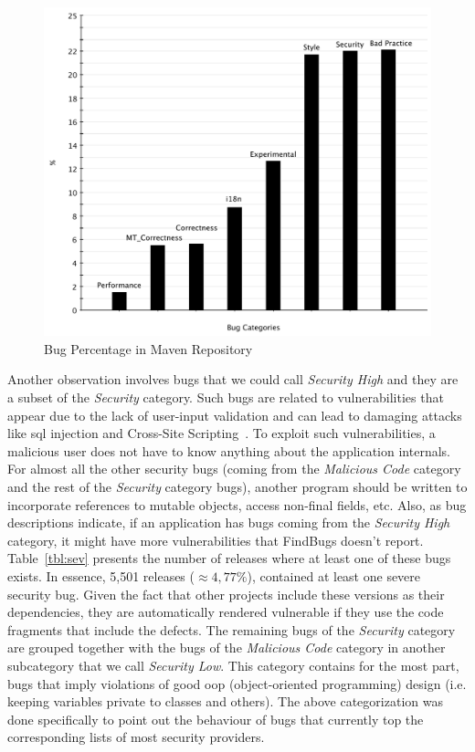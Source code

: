 \documentclass[letterpaper,twocolumn,10pt]{article}
\begin{document}
\begin{figure}[t]
	\centering
	\includegraphics[scale=0.35]{bug_percent}
	\caption{Bug Percentage in Maven Repository}
	\label{fig:bug-per} 
\end{figure}

Another observation involves bugs that we could call {\it
Security High} and they are a subset of the {\it Security} category.
Such bugs are related to vulnerabilities that appear due to the lack of user-input
validation and can lead to damaging attacks like {\sc sql} injection and
Cross-Site Scripting~\cite{RL12}.
To exploit such vulnerabilities, a malicious user does
not have to know anything about the application internals.
For almost all the other security bugs (coming from
the {\it Malicious Code} category and the rest of
the {\it Security} category bugs),
another program should be written to incorporate references to
mutable objects, access non-final fields, etc.
Also, as bug descriptions indicate,
if an application has bugs coming from the {\it Security High} category,
it might have more vulnerabilities that FindBugs doesn't report.
Table~\ref{tbl:sev} presents the number
of releases where at least one of these bugs exists. In essence, 5,501 releases
($\approx 4,77\% $), contained at
least one severe security bug. Given the fact that other projects include these
versions as their dependencies, they are automatically rendered vulnerable if
they use the code fragments that include the defects.
The remaining bugs of the {\it Security} category
are grouped together with the bugs of the {\it Malicious Code} category
in another subcategory that we call {\it Security Low}.
This category contains for the most part, bugs
that imply violations of good {\sc oop} (object-oriented programming)
design (i.e. keeping variables private to classes and others).
The above categorization was done specifically to point out the
behaviour of bugs that currently top the corresponding lists of most
security providers.
\end{document}
